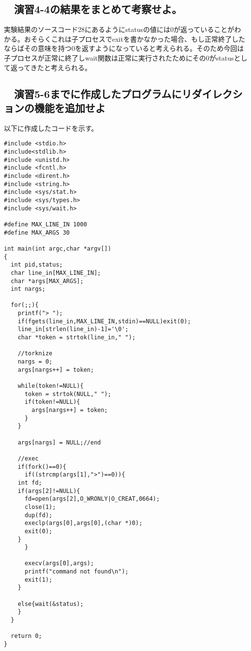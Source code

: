 \documentclass[a4paper,12pt]{jsarticle}
\begin{document}
\subsection*{　演習4-4の結果をまとめて考察せよ。}
実験結果のソースコード28にあるようにstatusの値には0が返っていることがわかる。おそらくこれは子プロセスでexitを書かなかった場合、もし正常終了したならばその意味を持つ0を返すようになっていると考えられる。そのため今回は子プロセスが正常に終了しwait関数は正常に実行されたためにその0がstatusとして返ってきたと考えられる。

\subsection*{　演習5-6までに作成したプログラムにリダイレクションの機能を追加せよ}
以下に作成したコードを示す。

\begin{lstlisting}[basicstyle=\footnotesize, caption={shell5-7.c}, label=kadai5-7]
#include <stdio.h>
#include<stdlib.h>
#include <unistd.h>
#include <fcntl.h>
#include <dirent.h>
#include <string.h>
#include <sys/stat.h>
#include <sys/types.h>
#include <sys/wait.h>

#define MAX_LINE_IN 1000
#define MAX_ARGS 30

int main(int argc,char *argv[])
{
  int pid,status;
  char line_in[MAX_LINE_IN];
  char *args[MAX_ARGS];
  int nargs;
  
  for(;;){
    printf("> ");
    if(fgets(line_in,MAX_LINE_IN,stdin)==NULL)exit(0);
    line_in[strlen(line_in)-1]='\0';
    char *token = strtok(line_in," ");
    
    //torknize
    nargs = 0;
    args[nargs++] = token;
    
    while(token!=NULL){
      token = strtok(NULL," ");
      if(token!=NULL){
		args[nargs++] = token;
      }
    }
    
    args[nargs] = NULL;//end
    
    //exec
    if(fork()==0){
      if((strcmp(args[1],">")==0)){
	int fd;
	if(args[2]!=NULL){
	  fd=open(args[2],O_WRONLY|O_CREAT,0664);
	  close(1);
	  dup(fd);
	  execlp(args[0],args[0],(char *)0);
	  exit(0);
	}
      }
      
      execv(args[0],args);
      printf("command not found\n");
      exit(1);
    }
    
    else{wait(&status);
    }
  }
  
  return 0;
}
\end{lstlisting}
\end{document}
